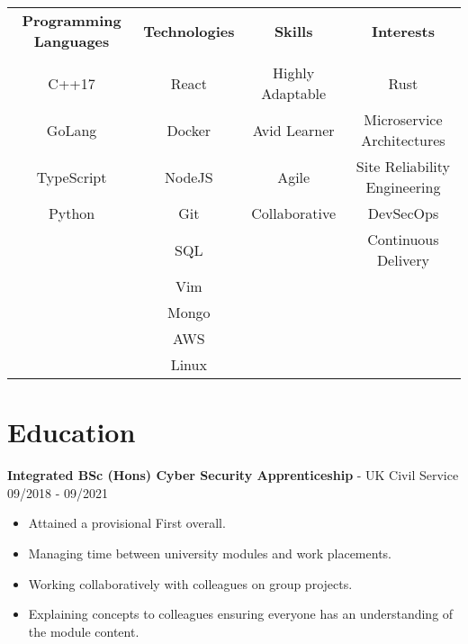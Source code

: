 \documentclass{article}
\begin{document}
\begin{center}
\begin{tabular}{ c | c | c | c } 
	\textbf{Programming Languages} & \textbf{Technologies} & \textbf{Skills}  & \textbf{Interests}           \\

	                               &                       &                  &                              \\
	C++17                          & React                 & Highly Adaptable & Rust                         \\
	GoLang                         & Docker                & Avid Learner     & Microservice Architectures   \\
	TypeScript                     & NodeJS                & Agile            & Site Reliability Engineering \\
	Python                         & Git                   & Collaborative    & DevSecOps                    \\
	                               & SQL                   &                  & Continuous Delivery          \\
	                               & Vim                   &                  &                              \\
	                               & Mongo                 &                  &                              \\
	                               & AWS                   &                  &                              \\
	                               & Linux                 &                  &                              \\

\end{tabular}
\end{center}

\clearpage

\section*{Education}

\textbf{Integrated BSc (Hons) Cyber Security Apprenticeship} - UK Civil Service \hfill 09/2018 - 09/2021

\begin{multicols}{2}
\begin{itemize}
\itemsep0em
	\item Attained a provisional First overall.
	\item Managing time between university modules and work placements.
	\item Working collaboratively with colleagues on group projects.
	\item Explaining concepts to colleagues ensuring everyone has an understanding of the module content.
\end{itemize}
\end{multicols}
\end{document}
